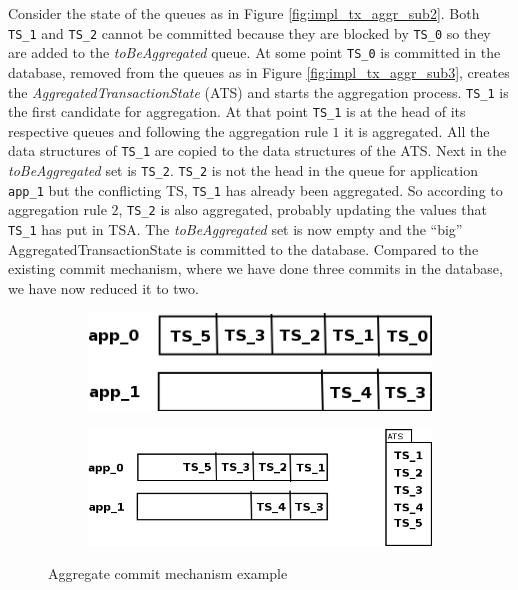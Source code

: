 Consider the state of the queues as in Figure
\ref{fig:impl_tx_aggr_sub2}. Both \texttt{TS\_1} and \texttt{TS\_2}
cannot be committed because they are blocked by \texttt{TS\_0} so they
are added to the \emph{toBeAggregated} queue. At some
point \texttt{TS\_0} is committed in the database, removed from the
queues as in Figure \ref{fig:impl_tx_aggr_sub3}, creates the
\emph{AggregatedTransactionState} (ATS)
and starts the aggregation process. \texttt{TS\_1} is the first
candidate for aggregation. At that point \texttt{TS\_1} is at the head
of its respective queues and following the aggregation rule $1$ it is
aggregated. All the data structures of \texttt{TS\_1} are copied to
the data structures of the ATS. Next in the \emph{toBeAggregated} set
is \texttt{TS\_2}. \texttt{TS\_2} is not the head in the queue for
application \texttt{app\_1} but the conflicting TS, \texttt{TS\_1} has
already been aggregated. So according to aggregation rule $2$,
\texttt{TS\_2} is also aggregated, probably updating the values that
\texttt{TS\_1} has put in TSA. The \emph{toBeAggregated} set is now
empty and the ``big'' AggregatedTransactionState is committed to the
database. Compared to the existing commit mechanism, where we have
done three commits in the database, we have now reduced it to two.

\begin{figure}
\centering
\begin{subfigure}[t]{0.3\textwidth}
\includegraphics[scale=0.4]{resources/images/Implementation/commit_system_aggr_example.png}
\caption{}
\label{fig:impl_tx_aggr_ex0}
\end{subfigure}

\begin{subfigure}[t]{0.3\textwidth}
  \includegraphics[scale=0.4]{resources/images/Implementation/commit_system_aggr_example_1.png}
  \caption{}
  \label{fig:impl_tx_aggr_ex1}
\end{subfigure}
\caption{Aggregate commit mechanism example}
\label{fig:impl_tx_aggr_example}
\end{figure}

